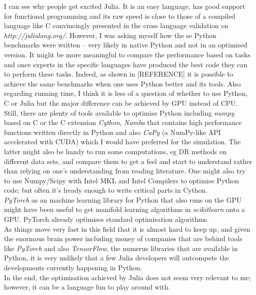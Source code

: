 \documentclass[journal, a4paper]{IEEEtran}
\begin{document}
I can see why people get excited Julia. It is an easy language, has good support for functional programming and its raw speed is close to those of a compiled language like C convincingly presented in the cross language validation on \textit{http://julialang.org/}. 
However, I was asking myself how the se Python benchmarks were written -- very likely in native Python and not in an optimised version. It might be more meaningful to compare the performance based on tasks and once experts in the specific languages have produced the best code they can to perform these tasks. Indeed, as shown in [REFERENCE] it is possible to achieve the same benchmarks when one uses Python better and its tools. Also regarding running time, I think it is less of a question of whether to use Python, C or Julia but the major difference can be achieved by GPU instead of CPU.
Still, there are plenty of tools available to optimise Python including \textit{numpy} based on C or the C extension \textit{Cython}, \textit{Numba} that contains high performance functions written directly in Python and also \textit{CuPy} (a NumPy-like API accelerated with CUDA) which I would have preferred for the simulation. The latter might also be handy to run some computations, eg DR methods on different data sets, and compare them to get a feel and start to understand rather than relying on one's understanding from reading literature. One might also try to use Numpy/Scipy with Intel MKL and Intel Compilers to optimise Python code; but often it's lready enough to write critical parts in Cython.\\

\textit{PyTorch} as an machine learning library for Python that also runs on the GPU might have been useful to get manifold learning algorithms in \textit{scikitlearn} onto a GPU. PyTorch already optimises standard optimisation algorithms.  \\

As things move very fast in this field that it is almost hard to keep up, and given the enormous brain power including money of companies that are behind tools like \textit{PyTorch} and also \textit{TensorFlow}, the numerus libraries that are available in Python, it is very unlikely that a few Julia developers will outcompete the developments currently happening in Python. \\

In the end, the optimisation achieved by Julia does not seem very relevant to me; however, it can be a language fun to play around with.
\end{document}
